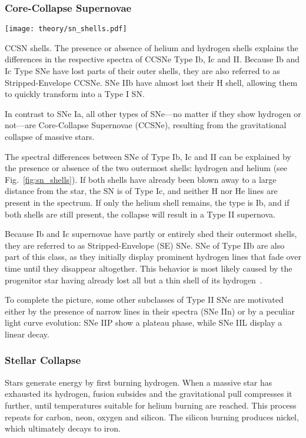 \subsubsection{Core-Collapse Supernovae}\label{ccsne}

\begin{marginfigure}
  \texttt{[image: theory/sn\_shells.pdf]}
  \caption[CCSN shells]{CCSN shells. The presence or absence of helium and hydrogen shells explains the differences in the respective spectra of CCSNe Type Ib, Ic and II. Because Ib and Ic Type SNe have lost parts of their outer shells, they are also referred to as Stripped-Envelope CCSNe. SNe IIb have almost lost their H shell, allowing them to quickly transform into a Type I SN.}
\end{marginfigure}

In contrast to SNe Ia, all other types of SNe---no matter if they show hydrogen or not---are Core-Collapse Supernovae (CCSNe), resulting from the gravitational collapse of massive stars.

The spectral differences between SNe of Type Ib, Ic and II can be explained by the presence or absence of the two outermost shells: hydrogen and helium (see Fig.~\ref{fig:sn_shells}). If both shells have already been blown away to a large distance from the star, the SN is of Type Ic, and neither H nor He lines are present in the spectrum. If only the helium shell remains, the type is Ib, and if both shells are still present, the collapse will result in a Type II supernova.

Because Ib and Ic supernovae have partly or entirely shed their outermost shells, they are referred to as Stripped-Envelope (SE) SNe. SNe of Type IIb are also part of this class, as they initially display prominent hydrogen lines that fade over time until they disappear altogether. This behavior is most likely caused by the progenitor star having already lost all but a thin shell of its hydrogen~.

To complete the picture, some other subclasses of Type II SNe are motivated either by the presence of narrow lines in their spectra (SNe IIn) or by a peculiar light curve evolution: SNe IIP show a plateau phase, while SNe IIL display a linear decay.

\subsubsection{Stellar Collapse}
Stars generate energy by first burning hydrogen. When a massive star has exhausted its hydrogen, fusion subsides and the gravitational pull compresses it further, until temperatures suitable for helium burning are reached. This process repeats for carbon, neon, oxygen and silicon. The silicon burning produces nickel, which ultimately decays to iron.

